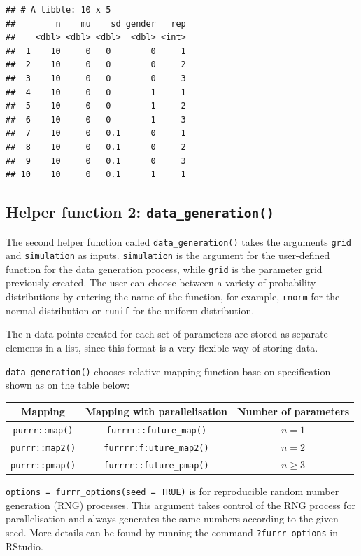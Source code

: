 \documentclass[11pt,a4paper]{article}
\begin{document}
\begin{verbatim}
## # A tibble: 10 x 5
##        n    mu    sd gender   rep
##    <dbl> <dbl> <dbl>  <dbl> <int>
##  1    10     0   0        0     1
##  2    10     0   0        0     2
##  3    10     0   0        0     3
##  4    10     0   0        1     1
##  5    10     0   0        1     2
##  6    10     0   0        1     3
##  7    10     0   0.1      0     1
##  8    10     0   0.1      0     2
##  9    10     0   0.1      0     3
## 10    10     0   0.1      1     1
\end{verbatim}

\hypertarget{helper-function-2-data_generation}{%
\subsection{\texorpdfstring{Helper function 2:
\texttt{data\_generation()}}{Helper function 2: data\_generation()}}\label{helper-function-2-data_generation}}

The second helper function called \texttt{data\_generation()} takes the
arguments \texttt{grid} and \texttt{simulation} as inputs.
\texttt{simulation} is the argument for the user-defined function for
the data generation process, while \texttt{grid} is the parameter grid
previously created. The user can choose between a variety of probability
distributions by entering the name of the function, for example,
\texttt{rnorm} for the normal distribution or \texttt{runif} for the
uniform distribution.

The n data points created for each set of parameters are stored as
separate elements in a list, since this format is a very flexible way of
storing data.

\texttt{data\_generation()} chooses relative mapping function base on
specification shown as on the table below:

\begin{longtable}[]{@{}ccc@{}}
\toprule()
Mapping & Mapping with parallelisation & Number of parameters \\
\midrule()
\endhead
\texttt{purrr::map()} & \texttt{furrrr::future\_map()} & \(n = 1\) \\
\texttt{purrr::map2()} & \texttt{furrrr:f:uture\_map2()} & \(n = 2\) \\
\texttt{purrr::pmap()} & \texttt{furrrr::future\_pmap()} &
\(n \geq 3\) \\
\bottomrule()
\end{longtable}

\texttt{options\ =\ furrr\_options(seed\ =\ TRUE)} is for reproducible
random number generation (RNG) processes. This argument takes control of
the RNG process for parallelisation and always generates the same
numbers according to the given seed. More details can be found by
running the command \texttt{?furrr\_options} in RStudio.
\end{document}
